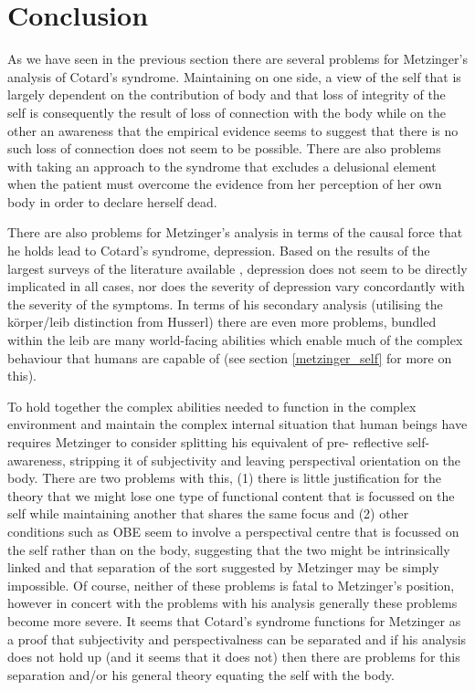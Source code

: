 \chapter{Conclusion}
\label{chap:conclusion}

As we have seen in the previous section there are several problems for Metzinger's analysis of Cotard's syndrome. Maintaining on one side, a view of the self that is largely dependent on the contribution of body and that loss of integrity of the self is consequently the result of loss of connection with the body while on the other an awareness that the empirical evidence seems to suggest that there is no such loss of connection does not seem to be possible. There are also problems with taking an approach to the syndrome that excludes a delusional element when the patient must overcome the evidence from her perception of her own body in order to declare herself dead.

There are also problems for Metzinger's analysis in terms of the causal force that he holds lead to Cotard's syndrome, depression. Based on the results of the largest surveys of the literature available \cite{berrios1995b}\cite{enoch1991}, depression does not seem to be directly implicated in all cases, nor does the severity of depression vary concordantly with the severity of the symptoms. In terms of his secondary analysis (utilising the k\"{o}rper/leib distinction from Husserl) there are even more problems, bundled within the leib are many world-facing abilities which enable much of the complex behaviour that humans are capable of (see section \ref{metzinger_self} for more on this).

To hold together the complex abilities needed to function in the complex environment and maintain the complex internal situation that human beings have requires Metzinger to consider splitting his equivalent of pre- reflective self-awareness, stripping it of subjectivity and leaving perspectival orientation on the body. There are two problems with this, (1) there is little justification for the theory that we might lose one type of functional content that is focussed on the self while maintaining another that shares the same focus and (2) other conditions such as OBE seem to involve a perspectival centre that is focussed on the self rather than on the body, suggesting that the two might be intrinsically linked and that separation of the sort suggested by Metzinger may be simply impossible. Of course, neither of these problems is fatal to Metzinger's position, however in concert with the problems with his analysis generally these problems become more severe. It seems that Cotard's syndrome functions for Metzinger as a proof that subjectivity and perspectivalness can be separated and if his analysis does not hold up (and it seems that it does not) then there are problems for this separation and/or his general theory equating the self with the body.

